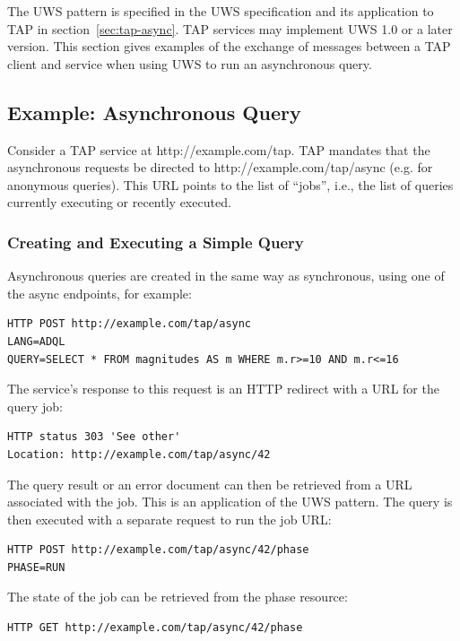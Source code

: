 \documentclass[11pt,letter]{ivoa}
\begin{document}
The UWS pattern is specified in the UWS specification \citep{2016ivoa.spec.1024H} and its application to TAP in 
section~\ref{sec:tap-async}. TAP services may implement UWS 1.0
or a later version. 
This section gives examples of the exchange of messages between a 
TAP client and service when using UWS to run an asynchronous query.

\subsection{Example: Asynchronous Query}
Consider a TAP service at http://example.com/tap. TAP mandates that the 
asynchronous requests be directed to http://example.com/tap/async (e.g. for 
anonymous queries). This URL points to the list of ``jobs'', i.e., the list of 
queries currently executing or recently executed.

\subsubsection{Creating and Executing a Simple Query}

Asynchronous queries are created in the same way as synchronous, using 
one of the {async} endpoints, for example:

\begin{verbatim}
HTTP POST http://example.com/tap/async
LANG=ADQL
QUERY=SELECT * FROM magnitudes AS m WHERE m.r>=10 AND m.r<=16
\end{verbatim}

The service's response to this request is an HTTP redirect with a URL for the 
query job:

\begin{verbatim}
HTTP status 303 'See other'
Location: http://example.com/tap/async/42
\end{verbatim}

The query result or an error document can then be retrieved from a URL 
associated with the job. This is an application of the UWS pattern. The query is 
then executed with a separate request to run the job URL:

\begin{verbatim}
HTTP POST http://example.com/tap/async/42/phase
PHASE=RUN
\end{verbatim}

The state of the job can be retrieved from the phase resource:

\begin{verbatim}
HTTP GET http://example.com/tap/async/42/phase
\end{verbatim}
\end{document}
